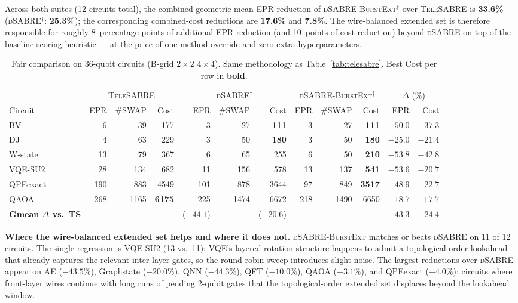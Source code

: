 \documentclass[conference]{IEEEtran}
\newcommand{\dSABRE}{\textsc{dSABRE}}
\newcommand{\BurstExt}{\textsc{dSABRE-BurstExt}}
\newcommand{\TeleSABRE}{\textsc{TeleSABRE}}
\begin{document}
Across both suites (12 circuits total), the combined geometric-mean EPR
reduction of \BurstExt$^{\dagger}$ over \TeleSABRE{} is \textbf{33.6\%}
(\dSABRE$^{\dagger}$: \textbf{25.3\%}); the corresponding combined-cost
reductions are \textbf{17.6\%} and \textbf{7.8\%}.
The wire-balanced extended set is therefore responsible for roughly
8~percentage points of additional EPR reduction (and 10~points of cost
reduction) beyond \dSABRE{} on top of the baseline scoring heuristic --- at
the price of one method override and zero extra hyperparameters.

\begin{table}[t]
\centering
\caption{Fair comparison on 36-qubit circuits (B-grid $2\!\times\!2$ $4\!\times\!4$).
  Same methodology as Table~\ref{tab:telesabre}.
  Best Cost per row in \textbf{bold}.}
\label{tab:telesabre_36q}
\setlength{\tabcolsep}{5pt}
\begin{tabular}{@{}l rrr rrr rrr rr@{}}
\toprule
 & \multicolumn{3}{c}{\TeleSABRE}
 & \multicolumn{3}{c}{\dSABRE$^{\dagger}$}
 & \multicolumn{3}{c}{\BurstExt$^{\dagger}$}
 & \multicolumn{2}{c}{$\Delta$ (\%)} \\
\cmidrule(lr){2-4}\cmidrule(lr){5-7}\cmidrule(lr){8-10}\cmidrule(lr){11-12}
Circuit & EPR & \#SWAP & Cost & EPR & \#SWAP & Cost & EPR & \#SWAP & Cost & EPR & Cost \\
\midrule
BV       &   6 &   39 & 177  &   3 &   27 & \textbf{111} &   3 &   27 & \textbf{111} & $-50.0$ & $-37.3$ \\
DJ       &   4 &   63 & 229  &   3 &   50 & \textbf{180} &   3 &   50 & \textbf{180} & $-25.0$ & $-21.4$ \\
W-state  &  13 &   79 & 367  &   6 &   65 & 255  &   6 &   50 & \textbf{210} & $-53.8$ & $-42.8$ \\
VQE-SU2  &  28 &  134 & 682  &  11 &  156 & 578  &  13 &  137 & \textbf{541} & $-53.6$ & $-20.7$ \\
QPEexact & 190 &  883 & 4549 & 101 &  878 & 3644 &  97 &  849 & \textbf{3517} & $-48.9$ & $-22.7$ \\
QAOA     & 268 & 1165 & \textbf{6175} & 225 & 1474 & 6672 & 218 & 1490 & 6650 & $-18.7$ & $+7.7$ \\
\midrule
\textbf{Gmean $\Delta$ vs.\ TS} & & & & ($-44.1$) & & ($-20.6$) & & & & $\mathbf{-43.3}$ & $\mathbf{-24.4}$ \\
\bottomrule
\end{tabular}
\end{table}

\textbf{Where the wire-balanced extended set helps and where it does not.}
\BurstExt{} matches or beats \dSABRE{} on 11 of 12 circuits.
The single regression is VQE-SU2 (13 vs.\ 11): VQE's layered-rotation
structure happens to admit a topological-order lookahead that already
captures the relevant inter-layer gates, so the round-robin sweep introduces
slight noise.
The largest reductions over \dSABRE{} appear on AE ($-43.5\%$), Graphstate
($-20.0\%$), QNN ($-44.3\%$), QFT ($-10.0\%$), QAOA ($-3.1\%$), and
QPEexact ($-4.0\%$): circuits where front-layer wires continue with long
runs of pending 2-qubit gates that the topological-order extended set
displaces beyond the lookahead window.
\end{document}
